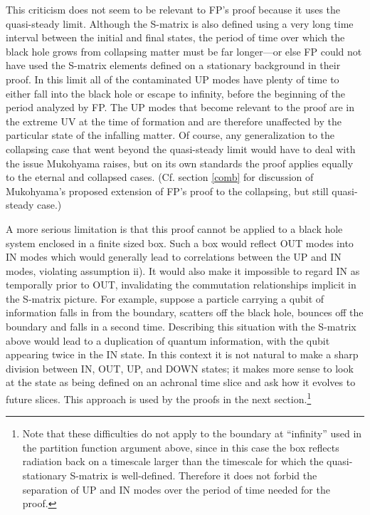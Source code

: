 \documentclass{article}
\begin{document}
This criticism does not seem to be relevant to FP's proof because it uses the quasi-steady limit.  Although the S-matrix is also defined using a very long time interval between the initial and final states, the period of time over which the black hole grows from collapsing matter must be far longer---or else FP could not have used the S-matrix elements defined on a stationary background in their proof.  In this limit all of the contaminated UP modes have plenty of time to either fall into the black hole or escape to infinity, before the beginning of the period analyzed by FP.  The UP modes that become relevant to the proof are in the extreme UV at the time of formation and are therefore unaffected by the particular state of the infalling matter.  Of course, any generalization to the collapsing case that went beyond the quasi-steady limit would have to deal with the issue Mukohyama raises, but on its own standards the proof applies equally to the eternal and collapsed cases.  (Cf. section \ref{comb} for discussion of Mukohyama's proposed extension \cite{muko97} of FP's proof to the collapsing, but still quasi-steady case.)

A more serious limitation is that this proof cannot be applied to a black hole system enclosed in a finite sized box.  Such a box would reflect OUT modes into IN modes which would generally lead to correlations between the UP and IN modes, violating assumption ii).  It would also make it impossible to regard IN as temporally prior to OUT, invalidating the commutation relationships implicit in the S-matrix picture.  For example, suppose a particle carrying a qubit of information falls in from the boundary, scatters off the black hole, bounces off the boundary and falls in a second time.  Describing this situation with the S-matrix above would lead to a duplication of quantum information, with the qubit appearing twice in the IN state.  In this context it is not natural to make a sharp division between IN, OUT, UP, and DOWN states; it makes more sense to look at the state as being defined on an achronal time slice and ask how it evolves to future slices.  This approach is used by the proofs in the next section.\footnote{Note that these difficulties do not apply to the boundary at ``infinity'' used in the partition function argument above, since in this case the box reflects radiation back on a timescale larger than the timescale for which the quasi-stationary S-matrix is well-defined.  Therefore it does not forbid the separation of UP and IN modes over the period of time needed for the proof.}
\end{document}
